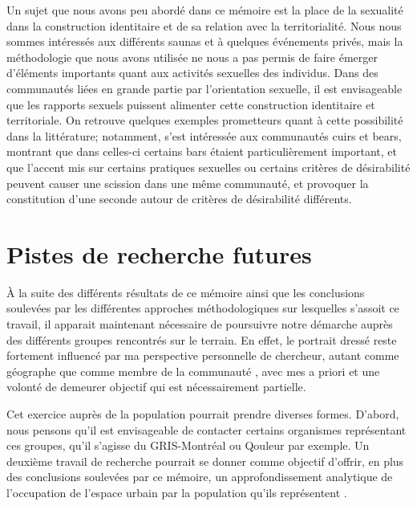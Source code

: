 Un sujet que nous avons peu abordé dans ce mémoire est la place de la sexualité dans la construction identitaire et de sa relation avec la territorialité.
Nous nous sommes intéressés aux différents saunas et à quelques événements privés, mais la méthodologie que nous avons utilisée ne nous a pas permis de faire émerger d'éléments importants quant aux activités sexuelles des individus.
Dans des communautés liées en grande partie par l'orientation sexuelle, il est envisageable que les rapports sexuels puissent alimenter cette construction identitaire et territoriale.
On retrouve quelques exemples prometteurs quant à cette possibilité dans la littérature; notamment, \citet{Hennen2013} s'est intéressée aux communautés cuirs et bears, montrant que dans celles-ci certains bars étaient particulièrement important, et que l'accent mis sur certains pratiques sexuelles ou certains critères de désirabilité peuvent causer une scission dans une même communauté, et provoquer la constitution d'une seconde autour de critères de désirabilité différents.

\section*{Pistes de recherche futures}
\label{sec:pistes_de_recherches}

À la suite des différents résultats de ce mémoire ainsi que les conclusions soulevées par les différentes approches méthodologiques sur lesquelles s'assoit ce travail, il apparait maintenant nécessaire de poursuivre notre démarche auprès des différents groupes rencontrés sur le terrain.
En effet, le portrait dressé reste fortement influencé par ma perspective personnelle de chercheur, autant comme géographe que comme membre de la communauté \lgbt{}, avec mes a priori et une volonté de demeurer objectif qui est nécessairement partielle.

Cet exercice auprès de la population pourrait prendre diverses formes.
D'abord, nous pensons qu'il est envisageable de contacter certains organismes représentant ces groupes, qu'il s'agisse du GRIS-Montréal ou Qouleur par exemple.
Un deuxième travail de recherche pourrait se donner comme objectif d'offrir, en plus des conclusions soulevées par ce mémoire, un approfondissement analytique de l'occupation de l'espace urbain par la population qu'ils représentent .

